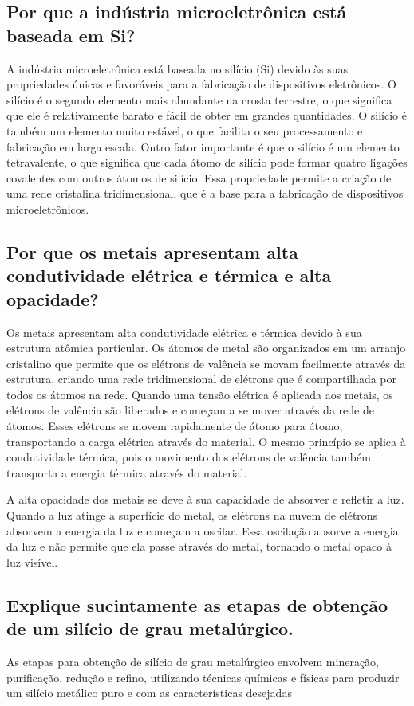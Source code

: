\subsection{Por que a indústria microeletrônica está baseada em Si?}
A indústria microeletrônica está baseada no silício (Si) devido às suas propriedades únicas e favoráveis para a fabricação de dispositivos eletrônicos.
O silício é o segundo elemento mais abundante na crosta terrestre, o que significa que ele é relativamente barato e fácil de obter em grandes quantidades. O silício é também um elemento muito estável, o que facilita o seu processamento e fabricação em larga escala. Outro fator importante é que o silício é um elemento tetravalente, o que significa que cada átomo de silício pode formar quatro ligações covalentes com outros átomos de silício. Essa propriedade permite a criação de uma rede cristalina tridimensional, que é a base para a fabricação de dispositivos microeletrônicos.
\subsection{Por que os metais apresentam alta condutividade elétrica e térmica e alta opacidade?}
Os metais apresentam alta condutividade elétrica e térmica devido à sua estrutura atômica particular. Os átomos de metal são organizados em um arranjo cristalino que permite que os elétrons de valência se movam facilmente através da estrutura, criando uma rede tridimensional de elétrons que é compartilhada por todos os átomos na rede.
Quando uma tensão elétrica é aplicada aos metais, os elétrons de valência são liberados e começam a se mover através da rede de átomos. Esses elétrons se movem rapidamente de átomo para átomo, transportando a carga elétrica através do material. O mesmo princípio se aplica à condutividade térmica, pois o movimento dos elétrons de valência também transporta a energia térmica através do material.

A alta opacidade dos metais se deve à sua capacidade de absorver e refletir a luz. Quando a luz atinge a superfície do metal, os elétrons na nuvem de elétrons absorvem a energia da luz e começam a oscilar. Essa oscilação absorve a energia da luz e não permite que ela passe através do metal, tornando o metal opaco à luz visível.
\subsection{Explique sucintamente as etapas de obtenção de um silício de grau metalúrgico.}
As etapas para obtenção de silício de grau metalúrgico envolvem mineração, purificação, redução e refino, utilizando técnicas químicas e físicas para produzir um silício metálico puro e com as características desejadas
